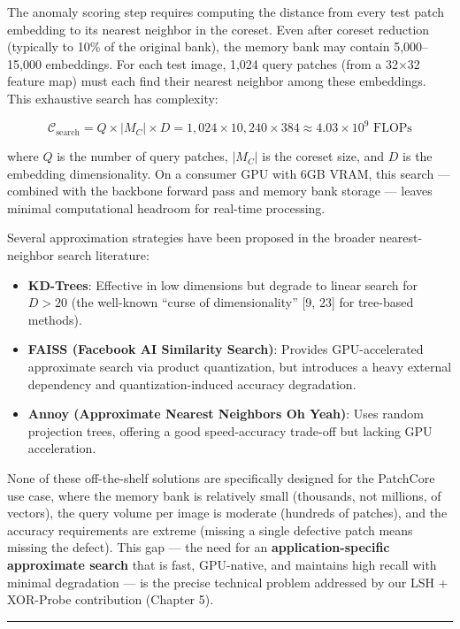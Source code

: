 The anomaly scoring step requires computing the distance from every test patch embedding to its nearest neighbor in the coreset. Even after coreset reduction (typically to 10\% of the original bank), the memory bank may contain 5,000--15,000 embeddings. For each test image, 1,024 query patches (from a 32×32 feature map) must each find their nearest neighbor among these embeddings. This exhaustive search has complexity:

\[\mathcal{C}_{\text{search}} = Q \times |M_C| \times D = 1{,}024 \times 10{,}240 \times 384 \approx 4.03 \times 10^9 \text{ FLOPs}\]

where \(Q\) is the number of query patches, \(|M_C|\) is the coreset size, and \(D\) is the embedding dimensionality. On a consumer GPU with 6GB VRAM, this search --- combined with the backbone forward pass and memory bank storage --- leaves minimal computational headroom for real-time processing.

Several approximation strategies have been proposed in the broader nearest-neighbor search literature:

\begin{itemize}
\tightlist
\item
  \textbf{KD-Trees}: Effective in low dimensions but degrade to linear search for \(D > 20\) (the well-known ``curse of dimensionality'' {[}9, 23{]} for tree-based methods).
\item
  \textbf{FAISS (Facebook AI Similarity Search)}: Provides GPU-accelerated approximate search via product quantization, but introduces a heavy external dependency and quantization-induced accuracy degradation.
\item
  \textbf{Annoy (Approximate Nearest Neighbors Oh Yeah)}: Uses random projection trees, offering a good speed-accuracy trade-off but lacking GPU acceleration.
\end{itemize}

None of these off-the-shelf solutions are specifically designed for the PatchCore use case, where the memory bank is relatively small (thousands, not millions, of vectors), the query volume per image is moderate (hundreds of patches), and the accuracy requirements are extreme (missing a single defective patch means missing the defect). This gap --- the need for an \textbf{application-specific approximate search} that is fast, GPU-native, and maintains high recall with minimal degradation --- is the precise technical problem addressed by our LSH + XOR-Probe contribution (Chapter 5).

\begin{center}\rule{0.5\linewidth}{0.5pt}\end{center}

